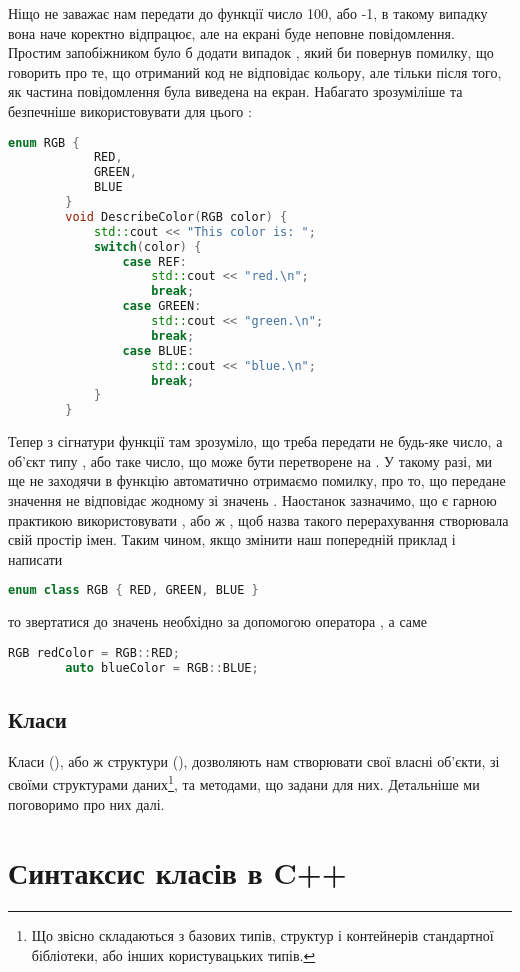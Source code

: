 \documentclass[12pt]{article}
\begin{document}
	Ніщо не заважає нам передати до функції  число 100, або -1, в такому випадку вона наче коректно відпрацює, але на екрані буде неповне повідомлення. Простим запобіжником було б додати випадок , який би повернув помилку, що говорить про те, що отриманий код не відповідає кольору, але тільки після того, як частина повідомлення була виведена на екран. Набагато зрозуміліше та безпечніше використовувати для цього :
	\begin{lstlisting}[language=c++]
		enum RGB {
			RED,
			GREEN,
			BLUE
		}
		void DescribeColor(RGB color) {
			std::cout << "This color is: ";
			switch(color) {
				case REF:
					std::cout << "red.\n";
					break;
				case GREEN:
					std::cout << "green.\n";
					break;
				case BLUE:
					std::cout << "blue.\n";
					break;
			}
		}
	\end{lstlisting}
	Тепер з сігнатури функції там зрозуміло, що треба передати не будь-яке число, а об'єкт типу , або таке число, що може бути перетворене на . У такому разі, ми ще не заходячи в функцію автоматично отримаємо помилку, про то, що передане значення не відповідає жодному зі значень .
	Наостанок зазначимо, що є гарною практикою використовувати , або ж , щоб назва такого перерахування створювала свій простір імен. Таким чином, якщо змінити наш попередній приклад і написати
	\begin{lstlisting}[language=c++]
		enum class RGB { RED, GREEN, BLUE }
	\end{lstlisting}
	то звертатися до значень необхідно за допомогою оператора \m{::}, а саме
	\begin{lstlisting}[language=c++]
		RGB redColor = RGB::RED;
		auto blueColor = RGB::BLUE;
	\end{lstlisting}

	\subsection{Класи}
	Класи (), або ж структури (), дозволяють нам створювати свої власні об'єкти, зі своїми структурами даних\footnote{Що звісно складаються з базових типів, структур і контейнерів стандартної бібліотеки, або інших користувацьких типів.}, та методами, що задани для них. Детальніше ми поговоримо про них далі.

	\section{Синтаксис класів в C++}
\end{document}
